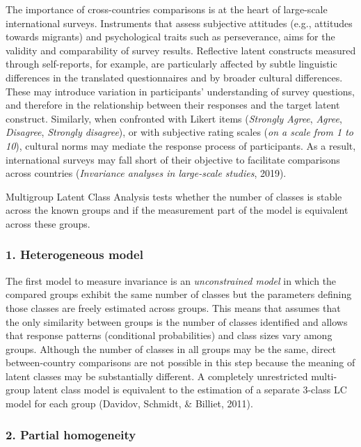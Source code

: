 \documentclass[12pt,a4paper,oneside]{reedthesis}
\begin{document}
The importance of cross-countries comparisons is at the heart of large-scale international surveys. Instruments that assess subjective attitudes (e.g., attitudes towards migrants) and psychological traits such as perseverance, aims for the validity and comparability of survey results. Reflective latent constructs measured through self-reports, for example, are particularly affected by subtle linguistic differences in the translated questionnaires and by broader cultural differences. These may introduce variation in participants' understanding of survey questions, and therefore in the relationship between their responses and the target latent construct. Similarly, when confronted with Likert items (\emph{Strongly Agree}, \emph{Agree}, \emph{Disagree}, \emph{Strongly disagree}), or with subjective rating scales (\emph{on a scale from 1 to 10}), cultural norms may mediate the response process of participants. As a result, international surveys may fall short of their objective to facilitate comparisons across countries (\emph{Invariance analyses in large-scale studies}, 2019).

Multigroup Latent Class Analysis tests whether the number of classes is stable across the known groups and if the measurement part of the model is equivalent across these groups.

\hypertarget{heterogeneous-model}{%
\subsubsection{1. Heterogeneous model}\label{heterogeneous-model}}

The first model to measure invariance is an \emph{unconstrained model} in which the compared groups exhibit the same number of classes but the parameters defining those classes are freely estimated across groups. This means that assumes that the only similarity between groups is the number of classes identified and allows that response patterns (conditional probabilities) and class sizes vary among groups. Although the number of classes in all groups may be the same, direct between-country comparisons are not possible in this step because the meaning of latent classes may be substantially different. A completely unrestricted multi-group latent class model is equivalent to the estimation of a separate 3-class LC model for each group (Davidov, Schmidt, \& Billiet, 2011).

\hypertarget{partial-homogeneity}{%
\subsubsection{2. Partial homogeneity}\label{partial-homogeneity}}
\end{document}
